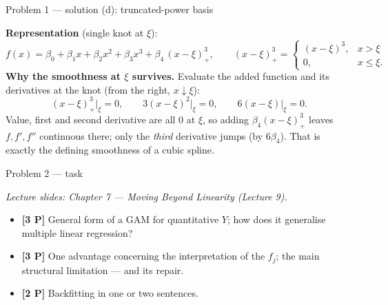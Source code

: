 \documentclass[aspectratio=169,11pt]{beamer}
\begin{document}
\begin{frame}{Problem 1 --- solution (d): truncated-power basis}
  \begin{solutionbox}
    \textbf{Representation} (single knot at $\xi$):
    \[
      f(x)=\beta_0+\beta_1x+\beta_2x^2+\beta_3x^3+\beta_4\,(x-\xi)^3_+,
      \qquad
      (x-\xi)^3_+=\begin{cases}(x-\xi)^3,& x>\xi\\[0.5mm]0,& x\le\xi.\end{cases}
    \]
    \textbf{Why the smoothness at $\xi$ survives.} Evaluate the added function and its derivatives
    at the knot (from the right, $x\downarrow\xi$):
    \[
      (x-\xi)^3_+\big|_{\xi}=0,\qquad
      3(x-\xi)^2\big|_{\xi}=0,\qquad
      6(x-\xi)\big|_{\xi}=0.
    \]
    Value, first and second derivative are all $0$ at $\xi$, so adding $\beta_4(x-\xi)^3_+$ leaves
    $f,f',f''$ continuous there; only the \emph{third} derivative jumps (by $6\beta_4$). That is
    exactly the defining smoothness of a cubic spline.
  \end{solutionbox}
\end{frame}

\begin{frame}{Problem 2 --- task}
  \begin{exercise}
    {\scriptsize\itshape Lecture slides: Chapter 7 --- Moving Beyond Linearity (Lecture 9).}\par\smallskip
    \begin{itemize}
      \item[(a)] \textbf{[3 P]} General form of a GAM for quantitative $Y$; how does it generalise
        multiple linear regression?
      \item[(b)] \textbf{[3 P]} One advantage concerning the interpretation of the $f_j$;
        the main structural limitation --- and its repair.
      \item[(c)] \textbf{[2 P]} Backfitting in one or two sentences.
    \end{itemize}
  \end{exercise}
\end{frame}
\end{document}
